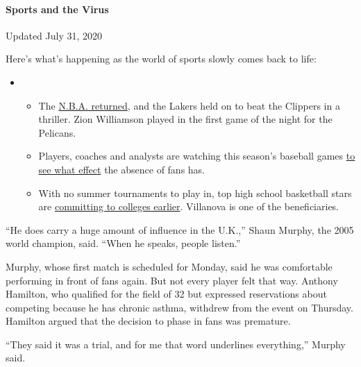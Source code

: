 \hypertarget{sports-and-the-virus}{%
\paragraph{Sports and the Virus}\label{sports-and-the-virus}}

Updated July 31, 2020

Here's what's happening as the world of sports slowly comes back to
life:

\begin{itemize}
\item
  \begin{itemize}
  \tightlist
  \item
    The
    \href{https://www.nytimes.com/2020/07/30/sports/basketball/clippers-lakers.html?action=click\&pgtype=Article\&state=default\&region=MAIN_CONTENT_2\&context=storylines_keepup}{N.B.A.
    returned}, and the Lakers held on to beat the Clippers in a
    thriller. Zion Williamson played in the first game of the night for
    the Pelicans.
  \item
    Players, coaches and analysts are watching this season's baseball
    games
    \href{https://www.nytimes.com/2020/07/31/sports/baseball/baseball-empty-stadiums-effects.html?action=click\&pgtype=Article\&state=default\&region=MAIN_CONTENT_2\&context=storylines_keepup}{to
    see what effect} the absence of fans has.
  \item
    With no summer tournaments to play in, top high school basketball
    stars are
    \href{https://www.nytimes.com/2020/07/30/sports/ncaabasketball/college-basketball-recruiting.html?action=click\&pgtype=Article\&state=default\&region=MAIN_CONTENT_2\&context=storylines_keepup}{committing
    to colleges earlier}. Villanova is one of the beneficiaries.
  \end{itemize}
\end{itemize}

``He does carry a huge amount of influence in the U.K.,'' Shaun Murphy,
the 2005 world champion, said. ``When he speaks, people listen.''

Murphy, whose first match is scheduled for Monday, said he was
comfortable performing in front of fans again. But not every player felt
that way. Anthony Hamilton, who qualified for the field of 32 but
expressed reservations about competing because he has chronic asthma,
withdrew from the event on Thursday. Hamilton argued that the decision
to phase in fans was premature.

``They said it was a trial, and for me that word underlines
everything,'' Murphy said.

